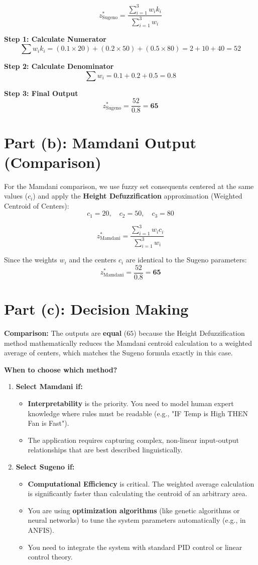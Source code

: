 \documentclass{article}
\begin{document}
\[ z^*_{\text{Sugeno}} = \frac{\sum_{i=1}^{3} w_i k_i}{\sum_{i=1}^{3} w_i} \]

\textbf{Step 1: Calculate Numerator}
\[ \sum w_i k_i = (0.1 \times 20) + (0.2 \times 50) + (0.5 \times 80) = 2 + 10 + 40 = 52 \]

\textbf{Step 2: Calculate Denominator}
\[ \sum w_i = 0.1 + 0.2 + 0.5 = 0.8 \]

\textbf{Step 3: Final Output}
\[ z^*_{\text{Sugeno}} = \frac{52}{0.8} = \mathbf{65} \]

\section{Part (b): Mamdani Output (Comparison)}
For the Mamdani comparison, we use fuzzy set consequents centered at the same values ($c_i$) and apply the \textbf{Height Defuzzification} approximation (Weighted Centroid of Centers):
\[ c_1 = 20, \quad c_2 = 50, \quad c_3 = 80 \]

\[ z^*_{\text{Mamdani}} = \frac{\sum_{i=1}^{3} w_i c_i}{\sum_{i=1}^{3} w_i} \]

Since the weights $w_i$ and the centers $c_i$ are identical to the Sugeno parameters:
\[ z^*_{\text{Mamdani}} = \frac{52}{0.8} = \mathbf{65} \]

\section{Part (c): Decision Making}
\textbf{Comparison:} The outputs are \textbf{equal} ($65$) because the Height Defuzzification method mathematically reduces the Mamdani centroid calculation to a weighted average of centers, which matches the Sugeno formula exactly in this case.

\textbf{When to choose which method?}

\begin{enumerate}
    \item \textbf{Select Mamdani if:}
    \begin{itemize}
        \item \textbf{Interpretability} is the priority. You need to model human expert knowledge where rules must be readable (e.g., "IF Temp is High THEN Fan is Fast").
        \item The application requires capturing complex, non-linear input-output relationships that are best described linguistically.
    \end{itemize}
    
    \item \textbf{Select Sugeno if:}
    \begin{itemize}
        \item \textbf{Computational Efficiency} is critical. The weighted average calculation is significantly faster than calculating the centroid of an arbitrary area.
        \item You are using \textbf{optimization algorithms} (like genetic algorithms or neural networks) to tune the system parameters automatically (e.g., in ANFIS).
        \item You need to integrate the system with standard PID control or linear control theory.
    \end{itemize}
\end{enumerate}
\end{document}
